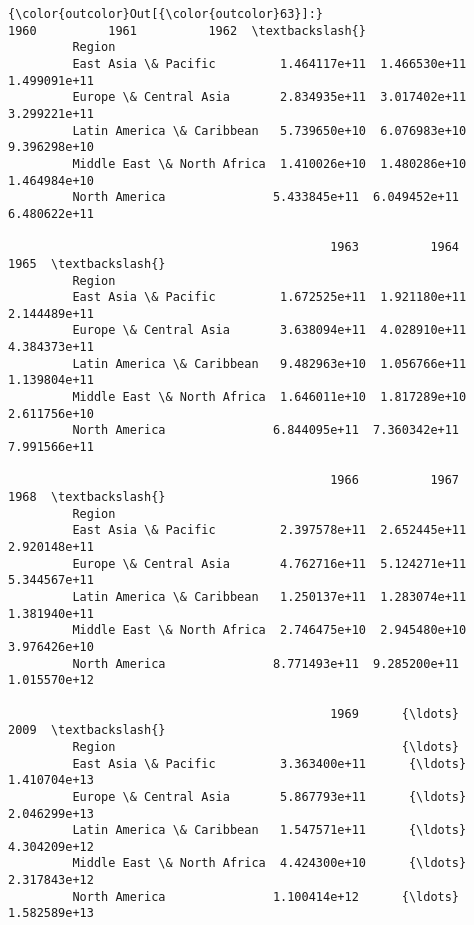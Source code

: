 \documentclass[11pt]{article}
\begin{document}
\begin{Verbatim}[commandchars=\\\{\}]
{\color{outcolor}Out[{\color{outcolor}63}]:}                                     1960          1961          1962  \textbackslash{}
         Region                                                                 
         East Asia \& Pacific         1.464117e+11  1.466530e+11  1.499091e+11   
         Europe \& Central Asia       2.834935e+11  3.017402e+11  3.299221e+11   
         Latin America \& Caribbean   5.739650e+10  6.076983e+10  9.396298e+10   
         Middle East \& North Africa  1.410026e+10  1.480286e+10  1.464984e+10   
         North America               5.433845e+11  6.049452e+11  6.480622e+11   
         
                                             1963          1964          1965  \textbackslash{}
         Region                                                                 
         East Asia \& Pacific         1.672525e+11  1.921180e+11  2.144489e+11   
         Europe \& Central Asia       3.638094e+11  4.028910e+11  4.384373e+11   
         Latin America \& Caribbean   9.482963e+10  1.056766e+11  1.139804e+11   
         Middle East \& North Africa  1.646011e+10  1.817289e+10  2.611756e+10   
         North America               6.844095e+11  7.360342e+11  7.991566e+11   
         
                                             1966          1967          1968  \textbackslash{}
         Region                                                                 
         East Asia \& Pacific         2.397578e+11  2.652445e+11  2.920148e+11   
         Europe \& Central Asia       4.762716e+11  5.124271e+11  5.344567e+11   
         Latin America \& Caribbean   1.250137e+11  1.283074e+11  1.381940e+11   
         Middle East \& North Africa  2.746475e+10  2.945480e+10  3.976426e+10   
         North America               8.771493e+11  9.285200e+11  1.015570e+12   
         
                                             1969      {\ldots}               2009  \textbackslash{}
         Region                                        {\ldots}                      
         East Asia \& Pacific         3.363400e+11      {\ldots}       1.410704e+13   
         Europe \& Central Asia       5.867793e+11      {\ldots}       2.046299e+13   
         Latin America \& Caribbean   1.547571e+11      {\ldots}       4.304209e+12   
         Middle East \& North Africa  4.424300e+10      {\ldots}       2.317843e+12   
         North America               1.100414e+12      {\ldots}       1.582589e+13   
         

\end{Verbatim}
\end{document}
